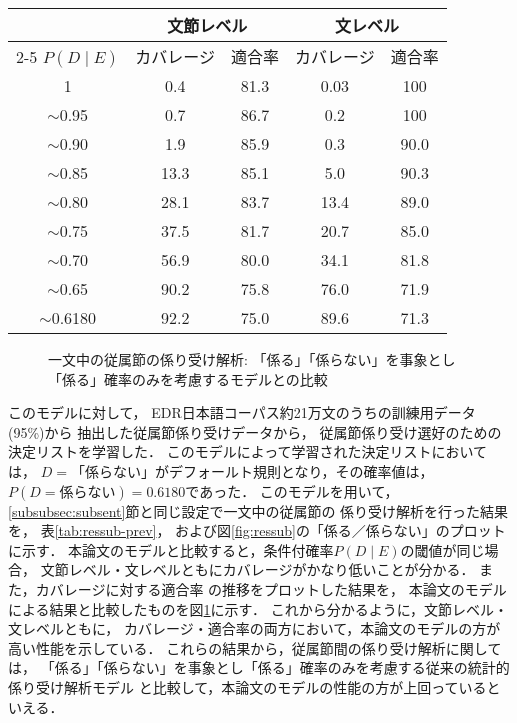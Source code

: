 \begin{table*}
\begin{center}
\caption{一文中の従属節の係り受け解析の実験結果 (\%):\\ 「係る」「係らない」を事象とし「係る」確率のみを考慮するモデル}  
\label{tab:ressub-prev}
\begin{tabular}[c]{|c||c|c||c|c|} \hline
                        &    \multicolumn{2}{|c||}{文節レベル} 
                        &    \multicolumn{2}{|c|}{文レベル} \\ \cline{2-5}
$P(D\mid E)$ & カバレージ & 適合率 & カバレージ & 適合率 \\ \hline\hline
1          &  0.4 & 81.3 & 0.03 & 100 \\ 
$\sim$0.95 &  0.7 & 86.7 & 0.2 & 100 \\ 
$\sim$0.90 & 1.9 & 85.9 & 0.3 & 90.0 \\
$\sim$0.85 & 13.3 & 85.1 & 5.0 & 90.3 \\
$\sim$0.80 & 28.1 & 83.7 & 13.4 & 89.0 \\
$\sim$0.75 & 37.5 & 81.7 & 20.7 & 85.0 \\
$\sim$0.70 & 56.9 & 80.0 & 34.1 & 81.8 \\
$\sim$0.65 & 90.2 & 75.8 & 76.0 & 71.9 \\
$\sim$0.6180 & 92.2 & 75.0 & 89.6 & 71.3  \\ \hline
\end{tabular}
\end{center}
\end{table*}


\begin{figure}
  \begin{center}

        \caption{一文中の従属節の係り受け解析: 「係る」「係らない」を事象とし\\「係る」確率のみを考慮するモデルとの比較}
        \label{fig:res_prev}
  \end{center}
\end{figure}

このモデルに対して，
EDR日本語コーパス約21万文のうちの訓練用データ(95\%)から
抽出した従属節係り受けデータから，
従属節係り受け選好のための決定リストを学習した．
\mbox{このモデ}ルによって学習された決定リストにおいては，
$D\!=\!「係らない」$がデフォールト規則となり，その確率値は，
$P(D\!=\!係らない)\!=\!0.6180$であった．
このモデルを用いて，
\ref{subsubsec:subsent}節と同じ設定で一文中の従属節の
係り受け解析を行った結果を，
表\ref{tab:ressub-prev}，
および図\ref{fig:ressub}の「係る／係らない」のプロットに示す．
本論文のモデルと比較すると，条件付確率$P(D\mid E)$の閾値が同じ場合，
文節レベル・文レベルともにカバレージがかなり低いことが分かる．
また，カバレージに対する適合率\break
の推移をプロットした結果を，
本論文のモデルによる結果と比較したものを図\ref{fig:res_prev}に示す．
\mbox{これか}ら分かるように，文節レベル・文レベルともに，
カバレージ・適合率の両方において，本論文のモデルの方が
高い性能を示している．
これらの結果から，従属節間の係り受け解析に関しては，
「係る」「係らない」を事象とし「係る」確率のみを考慮する従来の統計的係り受け解析モデル
と比較して，本論文のモデルの性能の方が上回っているといえる．


